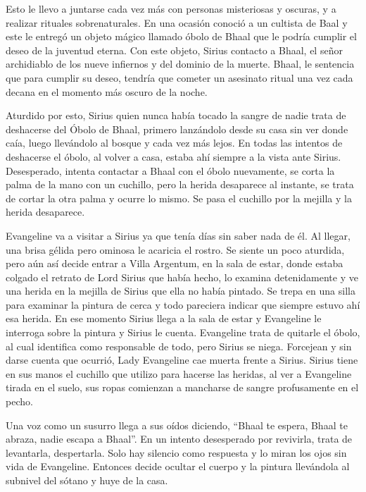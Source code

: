 \documentclass[10pt,twoside,twocolumn,openany]{dndbook}
\begin{document}
Esto le llevo a juntarse cada vez más con personas misteriosas y oscuras, y a realizar rituales
sobrenaturales. En una ocasión conoció a un cultista de Baal y este le entregó un objeto mágico
llamado óbolo de Bhaal que le podría cumplir el deseo de la juventud eterna. Con este objeto, 
Sirius contacto a Bhaal, el señor archidiablo de los nueve infiernos y del dominio de la muerte.
Bhaal, le sentencia que para cumplir su deseo, tendría que cometer un asesinato ritual una vez
cada decana en el momento más oscuro de la noche.

Aturdido por esto, Sirius quien nunca había tocado la sangre de nadie trata de deshacerse del 
Óbolo de Bhaal, primero lanzándolo desde su casa sin ver donde caía, luego llevándolo al bosque y 
cada vez más lejos. En todas las intentos de deshacerse el óbolo, al volver a casa, estaba ahí
siempre a la vista ante Sirius. Desesperado, intenta contactar a Bhaal con el óbolo nuevamente,
se corta la palma de la mano con un cuchillo, pero la herida desaparece al instante, se trata de
cortar la otra palma y ocurre lo mismo. Se pasa el cuchillo por la mejilla y la herida 
desaparece.

Evangeline va a visitar a Sirius ya que tenía días sin saber nada de él. Al llegar, una brisa 
gélida pero ominosa le acaricia el rostro. Se siente un poco aturdida, pero aún así decide entrar 
a Villa Argentum, en la sala de estar, donde estaba colgado el retrato de Lord Sirius que había 
hecho, lo examina detenidamente y ve una herida en la mejilla de Sirius que ella no había 
pintado. Se trepa en una silla para examinar la pintura de cerca y todo pareciera indicar que 
siempre estuvo ahí esa herida. En ese momento Sirius llega a la sala de estar y Evangeline le 
interroga sobre la pintura y Sirius le cuenta. Evangeline trata de quitarle el óbolo, al cual 
identifica como responsable de todo, pero Sirius se niega. Forcejean y sin darse cuenta que 
ocurrió, Lady Evangeline cae muerta frente a Sirius. Sirius tiene en sus manos el cuchillo que 
utilizo para hacerse las heridas, al ver a Evangeline tirada en el suelo, sus ropas comienzan a 
mancharse de sangre profusamente en el pecho.

Una voz como un susurro llega a sus oídos diciendo, “Bhaal te espera, Bhaal te abraza, nadie 
escapa a Bhaal”. En un intento desesperado por revivirla, trata de levantarla, despertarla. Solo 
hay silencio como respuesta y lo miran los ojos sin vida de Evangeline. Entonces decide ocultar 
el cuerpo y la pintura llevándola al subnivel del sótano y huye de la casa. 
\end{document}

